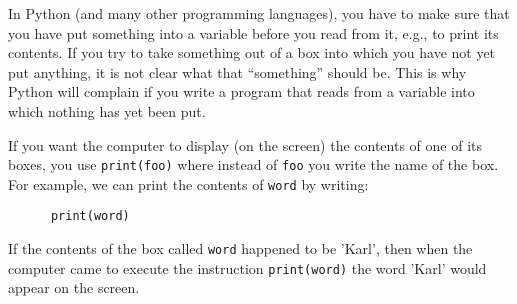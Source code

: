 %
%
%
%
%
In Python (and many other programming languages), you have to make sure
that you have put something into a variable before you read from it,
e.g., to print its contents. If you try to take something out of a box
into which you have not yet put anything, it is not clear what that
``something'' should be. This is why Python will complain if you write
a program that reads from a variable into which nothing has yet been put.



If you want the computer to display (on the screen) the contents of one of
its boxes, you use \verb!print(foo)! where instead of \verb!foo!
you write the name of the box.  For example, we can print the contents of
\verb!word! by writing:

\begin{Verbatim}
      print(word)
\end{Verbatim}

If the contents of the box called \verb!word! happened to be 'Karl', then when the
computer came to execute the instruction \verb!print(word)! the word 'Karl' would appear
on the screen.  



